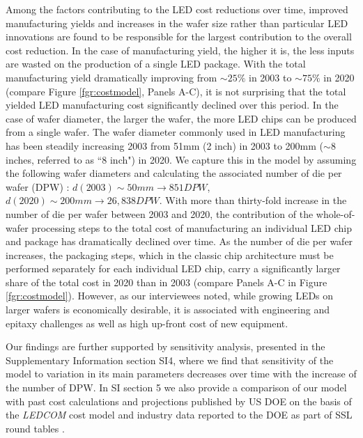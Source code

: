 \documentclass[twoside,twocolumn,9pt]{article}
\begin{document}
Among the factors contributing to the LED cost reductions over time, improved manufacturing yields and increases in the wafer size rather than particular LED innovations are found to be responsible for the largest contribution to the overall cost reduction. In the case of manufacturing yield, the higher it is, the less inputs are wasted on the production of a single LED package. With the total manufacturing yield dramatically improving from $\sim25\%$ in 2003 to $\sim75\%$ in 2020 (compare Figure \ref{fgr:costmodel}, Panels A-C), it is not surprising that the total yielded LED manufacturing cost significantly declined over this period. In the case of wafer diameter, the larger the wafer, the more LED chips can be produced from a single wafer. The wafer diameter commonly used in LED manufacturing has been steadily increasing 2003 from 51mm (2 inch) in 2003 to 200mm ($\sim$8 inches, referred to as “8 inch") in 2020. We capture this in the model by assuming the following wafer diameters and calculating the associated number of die per wafer (DPW) \cite{de2005investigation}: $d(2003)\sim 50 mm \rightarrow851 DPW$, $d(2020)\sim200 mm \rightarrow 26,838 DPW$. With more than thirty-fold increase in the number of die per wafer between 2003 and 2020, the contribution of the whole-of-wafer processing steps to the total cost of manufacturing an individual LED chip and package has dramatically declined over time. As the number of die per wafer increases, the packaging steps, which in the classic chip architecture must be performed separately for each individual LED chip, carry a significantly larger share of the total cost in 2020 than in 2003 (compare Panels A-C in Figure \ref{fgr:costmodel}). However, as our interviewees noted, while growing LEDs on larger wafers is economically desirable, it is associated with engineering and epitaxy challenges as well as high up-front cost of new equipment.

Our findings are further supported by sensitivity analysis, presented in the Supplementary Information section SI4, where we find that sensitivity of the model to variation in its main parameters decreases over time with the increase of the number of DPW. In SI section 5 we also provide a comparison of our model with past cost calculations and projections published by US DOE on the basis of the \textit{LEDCOM} cost model \cite{ledcomv2} and industry data reported to the DOE as part of SSL round tables \cite{doe2010solid}\cite{doe2011solid}\cite{doe2012solid}\cite{doe2013solid}\cite{doe2014solid}\cite{doe2015solid}\cite{doe2016solid}.
\end{document}
